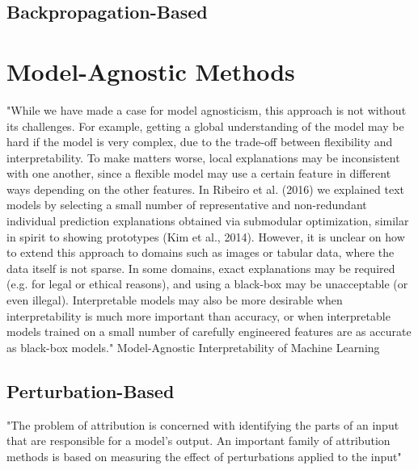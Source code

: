 \documentclass[main]{subfiles}
\begin{document}




\subsection{Backpropagation-Based}

\section{Model-Agnostic Methods}


"While we have made a case for model agnosticism, this
approach is not without its challenges. For example,
getting a global understanding of the model may be hard
if the model is very complex, due to the trade-off between
flexibility and interpretability. To make matters worse, local
explanations may be inconsistent with one another, since a
flexible model may use a certain feature in different ways
depending on the other features. In Ribeiro et al. (2016)
we explained text models by selecting a small number
of representative and non-redundant individual prediction
explanations obtained via submodular optimization, similar
in spirit to showing prototypes (Kim et al., 2014). However,
it is unclear on how to extend this approach to domains such
as images or tabular data, where the data itself is not sparse.
In some domains, exact explanations may be required (e.g.
for legal or ethical reasons), and using a black-box may
be unacceptable (or even illegal). Interpretable models
may also be more desirable when interpretability is much
more important than accuracy, or when interpretable models
trained on a small number of carefully engineered features
are as accurate as black-box models."  Model-Agnostic Interpretability of Machine Learning



\subsection{Perturbation-Based}

"The problem of attribution is concerned with identifying the parts of an input that are responsible for a model's output. An important family of attribution methods is based on measuring the effect of perturbations applied to the input"
\end{document}
